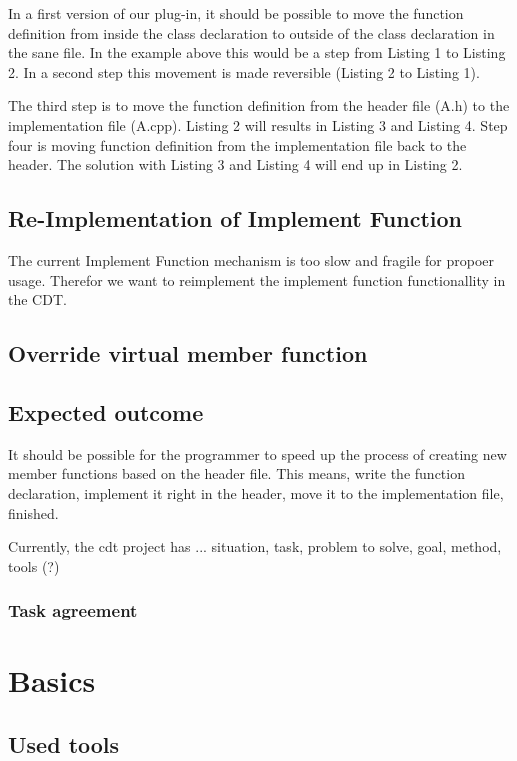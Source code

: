 \documentclass[a4paper,10pt,abstract=on]{scrreprt}
\begin{document}
In a first version of our plug-in, it should be possible to move the function definition from inside the class declaration to outside of the class declaration in the sane file. In the example above this would be a step from Listing 1 to Listing 2. In a second step this movement is made reversible (Listing 2 to Listing 1).

The third step is to move the function definition from the header file (A.h) to the implementation file (A.cpp). Listing 2 will results in Listing 3 and Listing 4. Step four is moving function definition from the implementation file back to the header. The solution with Listing 3 and Listing 4 will end up in Listing 2.

\section{Re-Implementation of Implement Function}

The current Implement Function mechanism is too slow and fragile for propoer usage. Therefor we want to reimplement the implement function functionallity in the CDT.

\section{Override virtual member function}

\section{Expected outcome}

It should be possible for the programmer to speed up the process of creating new member functions based on the header file. This means, write the function declaration, implement it right in the header, move it to the implementation file, finished.




Currently, the cdt project has ...
situation, task, problem to solve, goal, method, tools (?)
\subsection{Task agreement}

\chapter{Basics}
\section{Used tools}
\end{document}
